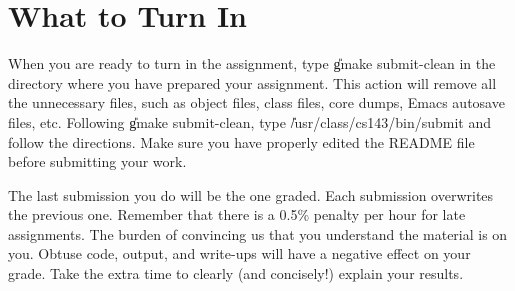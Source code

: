 \documentclass[11pt]{article}
\begin{document}
\section{What to Turn In}

When you are ready to turn in the assignment, type \U{gmake
submit-clean} in the directory where you have prepared your assignment.
This action will remove all the unnecessary files, such as object files,
class files, core dumps, Emacs autosave files, etc.  Following \U{gmake
submit-clean}, type \U{/usr/class/cs143/bin/submit} and follow the
directions. Make sure you have properly edited the README file before
submitting your work.


The last submission you do will be the one graded.  Each submission overwrites
the previous one.  Remember that there is a 0.5\% penalty per hour for
late assignments.  The burden of convincing us that you understand the
material is on you.  Obtuse code, output, and write-ups will have a
negative effect on your grade. Take the extra time to clearly (and
concisely!) explain your results.
\end{document}
